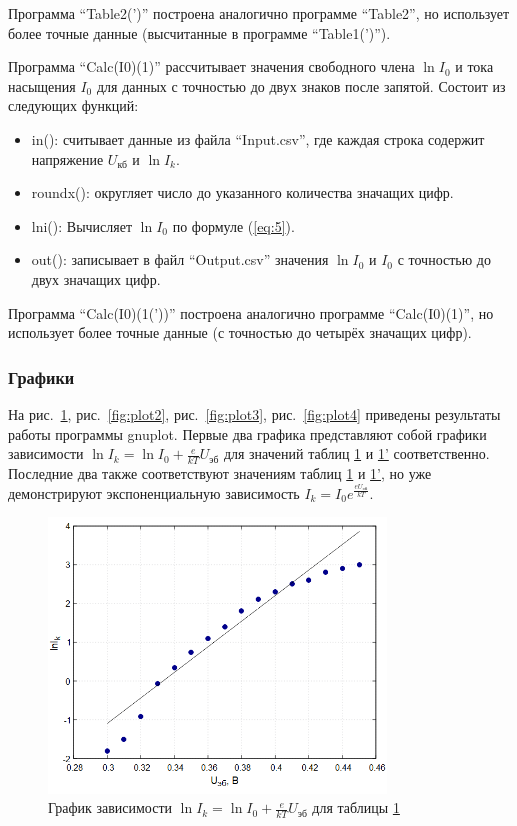 Программа ``Table2(')'' построена аналогично программе ``Table2'', но использует более точные данные (высчитанные в программе ``Table1(')'').

Программа ``Calc(I0)(1)'' рассчитывает значения свободного члена $\ln I_0$ и тока насыщения $I_0$ для данных с точностью до двух знаков после запятой. Состоит из следующих функций:
\begin{itemize}
\item in(): считывает данные из файла ``Input.csv'', где каждая строка содержит напряжение $U_{\text{кб}}$ и $\ln I_k$.
\item roundx(): округляет число до указанного количества значащих цифр.
\item lni(): Вычисляет $\ln I_0$ по формуле 
 (\ref{eq:5}).
\item out(): записывает в файл ``Output.csv'' значения $\ln I_0$ и $I_0$ с точностью до двух значащих цифр.
\end{itemize}

Программа ``Calc(I0)(1('))'' построена аналогично программе ``Calc(I0)(1)'', но использует более точные данные (с точностью до четырёх значащих цифр).

\subsubsection{Графики}

На рис.~\ref{fig:plot1}, рис.~\ref{fig:plot2}, рис.~\ref{fig:plot3}, рис.~\ref{fig:plot4} приведены результаты работы программы gnuplot. Первые два графика представляют собой графики зависимости $\ln I_k = \ln I_0 + \frac{e}{kT}U_{\text{эб}}$ для значений таблиц \hyperref[tabl:2]{1} и \hyperref[tabl:2]{1'} соответственно. Последние два также соответствуют значениям таблиц \hyperref[tabl:2]{1} и \hyperref[tabl:2]{1'}, но уже демонстрируют экспоненциальную зависимость $I_k = I_0e^{\frac{eU_{\text{эб}}}{kT}}$.

\begin{figure}[H]
\centering
\includegraphics[width=0.8\textwidth]{Plot1.png}
\caption{График зависимости $\ln I_k = \ln I_0 + \frac{e}{kT}U_{\text{эб}}$ для таблицы \hyperref[tabl:1]{1}}
\label{fig:plot1}
\end{figure}

